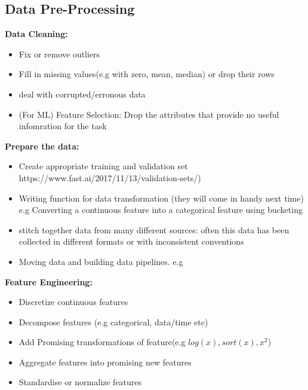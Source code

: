 \documentclass[openany]{book}
\begin{document}
\subsection{Data Pre-Processing}


\textbf{Data Cleaning:} 

\begin{itemize}
    \item Fix or remove outliers 
    \item  Fill in missing values(e.g with zero, mean, median) or drop their rows  
    \item deal with corrupted/erronous  data
    \item (For ML) Feature Selection: Drop the attributes that provide no useful infomration for the task 
\end{itemize}

\textbf{Prepare the data:}

\begin{itemize}
    \item Create appropriate training and validation set https://www.fast.ai/2017/11/13/validation-sets/)
    \item Writing function for data transformation (they will come in handy next time) e.g  Converting a continuous feature into a categorical feature using bucketing 
    \item  stitch together data from many different sources: often this data has been collected in different formats or with inconsistent conventions
    
    \item  Moving data and building data pipelines. e.g     
\end{itemize}


\textbf{ Feature Engineering: }

\begin{itemize}
    \item Discretize continuous features
    \item Decompose features (e.g categorical, data/time etc)
    \item Add Promising transformations of feature(e.g $log(x), sort(x), x^2$)
    \item Aggregate features into promising new features
    \item Standardise or normalize features  
\end{itemize}
\end{document}
